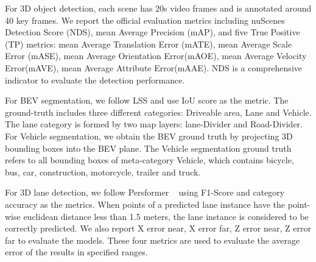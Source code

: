 \documentclass[10pt,twocolumn,letterpaper]{article}
\begin{document}
For 3D object detection, each scene has 20s video frames and is annotated around 40 key frames. We report the official evaluation metrics including nuScenes Detection Score (NDS), mean Average Precision (mAP), and five True Positive (TP) metrics: mean Average Translation Error (mATE), mean Average Scale Error (mASE), mean Average Orientation Error(mAOE), mean Average Velocity Error(mAVE), mean Average Attribute Error(mAAE). NDS is a comprehensive indicator to evaluate the detection performance.


For BEV segmentation, we follow LSS \cite{philion2020lift} and use IoU score as the metric. The ground-truth includes three different categories: Driveable area, Lane and Vehicle. The lane category is formed by two map layers: lane-Divider and Road-Divider. For Vehicle segmentation, we obtain the BEV ground truth by projecting 3D bounding boxes into the BEV plane\cite{philion2020lift}. The Vehicle segmentation ground truth refers to all bounding boxes of meta-category Vehicle, which contains bicycle, bus, car, construction, motorcycle, trailer and truck.

For 3D lane detection, we follow Persformer ~\cite{chen2022persformer} using F1-Score and category accuracy as the metrics.
When  points of a predicted lane instance have the point-wise euclidean distance less than 1.5 meters, the lane instance is considered to be correctly predicted.
We also report X error near, X error far, Z error near, Z error far to evaluate the models. These four metrics are used to evaluate the average error of the results in specified ranges.
\end{document}

